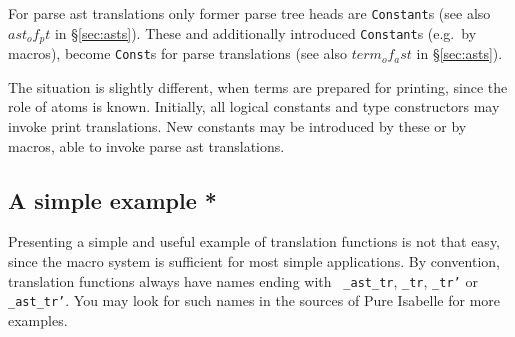 For parse ast translations only former parse tree heads are {\tt Constant}s
(see also $ast_of_pt$ in \S\ref{sec:asts}). These and additionally introduced
{\tt Constant}s (e.g.\ by macros), become {\tt Const}s for parse translations
(see also $term_of_ast$ in \S\ref{sec:asts}).

The situation is slightly different, when terms are prepared for printing,
since the role of atoms is known. Initially, all logical constants and type
constructors may invoke print translations. New constants may be introduced
by these or by macros, able to invoke parse ast translations.


\subsection{A simple example *}

Presenting a simple and useful example of translation functions is not that
easy, since the macro system is sufficient for most simple applications. By
convention, translation functions always have names ending with {\tt
_ast_tr}, {\tt _tr}, {\tt _tr'} or {\tt _ast_tr'}. You may look for such
names in the sources of Pure Isabelle for more examples.

